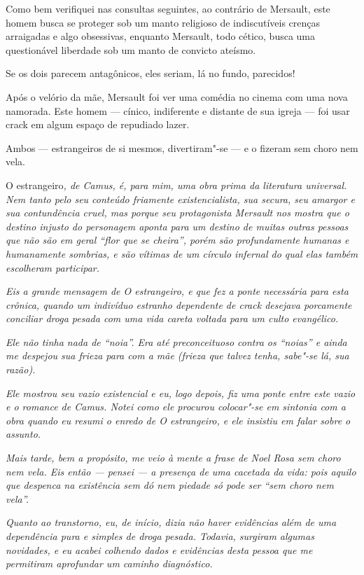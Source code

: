 Como bem verifiquei nas consultas seguintes, ao contrário de Mersault,
este homem busca se proteger sob um manto religioso de indiscutíveis
crenças arraigadas e algo obsessivas, enquanto Mersault, todo cético,
busca uma questionável liberdade sob um manto de convicto ateísmo.

Se os dois parecem antagônicos, eles seriam, lá no fundo, parecidos!

Após o velório da mãe, Mersault foi ver uma comédia no cinema com uma
nova namorada. Este homem --- cínico, indiferente e distante de sua
igreja --- foi usar crack em algum espaço de repudiado lazer.

Ambos --- estrangeiros de si mesmos, divertiram"-se --- e o fizeram sem
choro nem vela.

\begin{center}\asterisc{}\end{center}


O estrangeiro\emph{, de Camus, é, para mim, uma obra prima da literatura
universal. Nem tanto pelo seu conteúdo friamente existencialista, sua
secura, seu amargor e sua contundência cruel, mas porque seu
protagonista Mersault nos mostra que o destino injusto do personagem
aponta para um destino de muitas outras pessoas que não são em geral
``flor que se cheira'', porém são profundamente humanas e humanamente
sombrias, e são vítimas de um círculo infernal do qual elas também
escolheram participar.}~

\emph{Eis a grande mensagem de O estrangeiro, e que fez a ponte
necessária para esta crônica, quando um indivíduo estranho dependente de
crack desejava porcamente conciliar droga pesada com uma vida careta
voltada para um culto evangélico.}~

\emph{Ele não tinha nada de ``noia''. Era até preconceituoso contra os
``noias'' e ainda me despejou sua frieza para com a mãe (frieza que
talvez tenha, sabe"-se lá, sua razão).}~

\emph{Ele mostrou seu vazio existencial e eu, logo depois, fiz uma ponte
entre este vazio e o romance de Camus. Notei como ele procurou
colocar"-se em sintonia com a obra quando eu resumi o enredo de O
estrangeiro, e ele insistiu em falar sobre o assunto.}

\emph{Mais tarde, bem a propósito, me veio à mente a frase de Noel Rosa
sem choro nem vela. Eis então --- pensei --- a presença de uma cacetada
da vida: pois aquilo que despenca na existência sem dó nem piedade só
pode ser ``sem choro nem vela''.}~

\emph{Quanto ao transtorno, eu, de início, dizia não haver evidências
além de uma dependência pura e simples de droga pesada. Todavia,
surgiram algumas novidades, e eu acabei colhendo dados e evidências
desta pessoa que me permitiram aprofundar um caminho diagnóstico.}~

